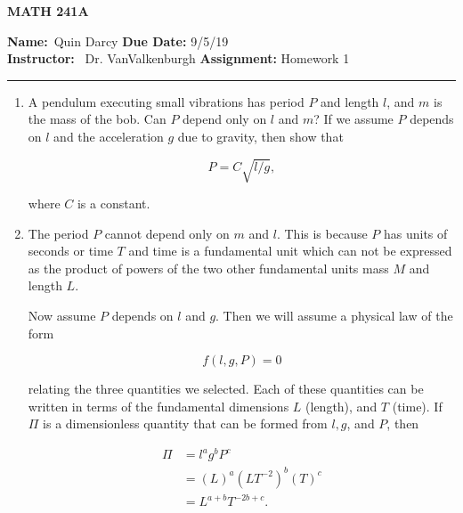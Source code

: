 \documentclass[12pt]{article}
\makeatletter
\theoremstyle{definition}
\theoremstyle{remark}
\newenvironment{solution}[1][\bf{\textit{Solution}}]{\par
  
  \normalfont \topsep6\p@\@plus6\p@\relax
  \list{}{\leftmargin=0mm
          \rightmargin=0mm
          \settowidth{\itemindent}{\itshape#1}%
          \labelwidth=\itemindent
          \parsep=0pt \listparindent=\parindent 
  }
  \item[\hskip\labelsep
        \itshape
    #1\@addpunct{.}]\ignorespaces
}{%
  \popQED\endlist\@endpefalse
}
\makeatother
\begin{document}
\begin{center}
	\vspace{.4cm} {\textbf { \large MATH 241A}}
\end{center}
{\textbf{Name:}\ Quin Darcy \hspace{\fill} \textbf{Due Date:} 9/5/19   \\
{ \textbf{Instructor:}} \ Dr. VanValkenburgh \hspace{\fill} \textbf{Assignment:} Homework 1 \\ \hrule}

\justifying


\vspace{2mm}


\begin{enumerate}[leftmargin=*]

    \item A pendulum executing small vibrations has period $P$ and length $l$, and $m$ is the mass of the bob. Can $P$ depend only on $l$ and $m$? If we assume $P$ depends on $l$ and the acceleration $g$ due to gravity, then show that 
    
    \begin{equation*}
        P=C\sqrt{l/g},
    \end{equation*}
    
    \noindent where $C$ is a constant.
    
    \begin{solution}
        The period $P$ cannot depend only on $m$ and $l$. This is because $P$ has units of seconds or time $T$ and time is a fundamental unit which can not be expressed as the product of powers of the two other fundamental units mass $M$ and length $L$.\par\hspace{4mm} Now assume $P$ depends on $l$ and $g$. Then we will assume a physical law of the form 
        
        \begin{equation*}
            f(l,g,P)=0
        \end{equation*}
        
        \noindent relating the three quantities we selected. Each of these quantities can be written in terms of the fundamental dimensions $L$ (length), and $T$ (time). If $\Pi$ is a dimensionless quantity that can be formed from $l,g$, and $P$, then 
        
        \begin{equation*}
            \begin{split}
                \Pi &= l^ag^bP^c \\
                    &= (L)^a(LT^{-2})^b(T)^c \\
                    &= L^{a+b}T^{-2b+c}.
            \end{split}
        \end{equation*}
        

\end{solution}
\end{enumerate}
\end{document}
